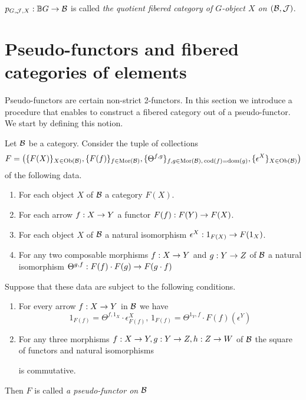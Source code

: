 \begin{definition}
$p_{G,{\mathcal J},X}:\mathbb{B}G\rightarrow {\mathcal B}$ is called \textit{the quotient fibered category of $G$-object $X$ on $({\mathcal B},{\mathcal J})$}.
\end{definition}

\section{Pseudo-functors and fibered categories of elements}
\noindent
Pseudo-functors are certain non-strict 2-functors. In this section we introduce a procedure that enables to construct a fibered category out of a pseudo-functor. We start by defining this notion.

\begin{definition}
Let ${\mathcal B}$ be a category. Consider the tuple of collections
$$F = \big(\{F(X)\}_{X\in \mathrm{Ob}({\mathcal B})},\{F(f)\}_{f\in \mathrm{Mor}({\mathcal B})},\{\Theta^{f,g}\}_{f,g\in \mathrm{Mor}({\mathcal B}),\,\mathrm{cod}(f)=\mathrm{dom}(g)},\{\epsilon^X\}_{X\in \mathrm{Ob}({\mathcal B})}\big)$$
of the following data.
\begin{enumerate}[label=\textbf{(\arabic*)}, leftmargin=3.0em]
\item For each object $X$ of ${\mathcal B}$ a category $F(X)$.
\item For each arrow $f:X\rightarrow Y$ a functor $F(f):F(Y)\rightarrow F(X)$.
\item For each object $X$ of ${\mathcal B}$ a natural isomorphism $\epsilon^X:1_{F(X)} \rightarrow F(1_{X})$.
\item For any two composable morphisms $f:X\rightarrow Y$ and $g:Y\rightarrow Z$ of ${\mathcal B}$ a natural isomorphism $\Theta^{g,f}: F(f)\cdot F(g) \rightarrow F(g\cdot f)$
\end{enumerate}
Suppose that these data are subject to the following conditions.
\begin{enumerate}[label=\textbf{(\arabic*)}, leftmargin=3.0em]
\item For every arrow $f:X\rightarrow Y$ in ${\mathcal B}$ we have
$$1_{F(f)} = \Theta^{f,1_X} \cdot \epsilon^X_{F(f)},\,1_{F(f)} = \Theta^{1_Y,f} \cdot F(f)\left(\epsilon^Y\right)$$
\item For any three morphisms $f:X\rightarrow Y,g:Y\rightarrow Z,h:Z\rightarrow W$ of ${\mathcal B}$ the square of functors and natural isomorphisms
\begin{center}
\end{center}
is commutative.
\end{enumerate}
Then $F$ is called \textit{a pseudo-functor on ${\mathcal B}$}
\end{definition}
